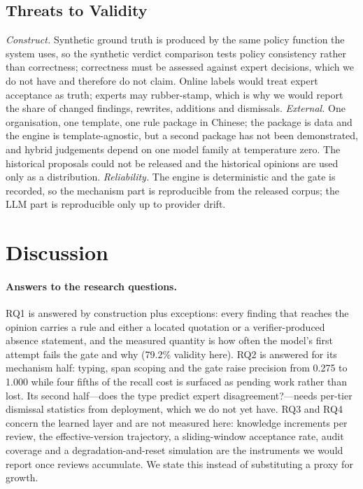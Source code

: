 \documentclass{IOS-Book-Article}
\begin{document}
\subsection{Threats to Validity}

\emph{Construct.} Synthetic ground truth is produced by the same policy function the system uses, so the synthetic verdict comparison tests policy consistency rather than correctness; correctness must be assessed against expert decisions, which we do not have and therefore do not claim. Online labels would treat expert acceptance as truth; experts may rubber-stamp, which is why we would report the share of changed findings, rewrites, additions and dismissals. \emph{External.} One organisation, one template, one rule package in Chinese; the package is data and the engine is template-agnostic, but a second package has not been demonstrated, and hybrid judgements depend on one model family at temperature zero. The historical proposals could not be released and the historical opinions are used only as a distribution. \emph{Reliability.} The engine is deterministic and the gate is recorded, so the mechanism part is reproducible from the released corpus; the LLM part is reproducible only up to provider drift.

\section{Discussion}

\paragraph{Answers to the research questions.}
RQ1 is answered by construction plus exceptions: every finding that reaches the opinion carries a rule and either a located quotation or a verifier-produced absence statement, and the measured quantity is how often the model's first attempt fails the gate and why (79.2\% validity here). RQ2 is answered for its mechanism half: typing, span scoping and the gate raise precision from 0.275 to 1.000 while four fifths of the recall cost is surfaced as pending work rather than lost. Its second half---does the type predict expert disagreement?---needs per-tier dismissal statistics from deployment, which we do not yet have. RQ3 and RQ4 concern the learned layer and are not measured here: knowledge increments per review, the effective-version trajectory, a sliding-window acceptance rate, audit coverage and a degradation-and-reset simulation are the instruments we would report once reviews accumulate. We state this instead of substituting a proxy for growth.
\end{document}
